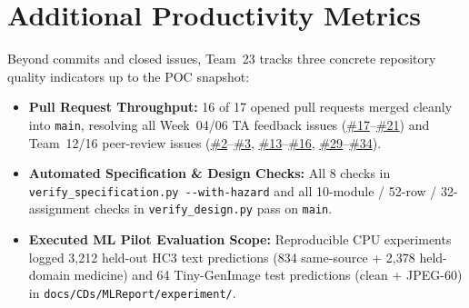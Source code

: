 \documentclass{article}
\begin{document}
\section{Additional Productivity Metrics}

Beyond commits and closed issues, Team~23 tracks three concrete repository quality indicators up to the POC snapshot:
\begin{itemize}
    \item \textbf{Pull Request Throughput:} 16 of 17 opened pull requests merged cleanly into \texttt{main}, resolving all Week~04/06 TA feedback issues (\href{https://github.com/richy1337/Verity/issues/17}{\#17}--\href{https://github.com/richy1337/Verity/issues/21}{\#21}) and Team~12/16 peer-review issues (\href{https://github.com/richy1337/Verity/issues/2}{\#2}--\href{https://github.com/richy1337/Verity/issues/3}{\#3}, \href{https://github.com/richy1337/Verity/issues/13}{\#13}--\href{https://github.com/richy1337/Verity/issues/16}{\#16}, \href{https://github.com/richy1337/Verity/issues/29}{\#29}--\href{https://github.com/richy1337/Verity/issues/34}{\#34}).
    \item \textbf{Automated Specification \& Design Checks:} All 8 checks in \texttt{verify\_\allowbreak{}specification.py -{}-with-hazard} and all 10-module / 52-row / 32-assignment checks in \texttt{verify\_\allowbreak{}design.py} pass on \texttt{main}.
    \item \textbf{Executed ML Pilot Evaluation Scope:} Reproducible CPU experiments logged 3,212 held-out HC3 text predictions (834 same-source + 2,378 held-domain medicine) and 64 Tiny-GenImage test predictions (clean + JPEG-60) in \texttt{docs/\allowbreak{}CDs/\allowbreak{}MLReport/\allowbreak{}experiment/}.
\end{itemize}
\end{document}
